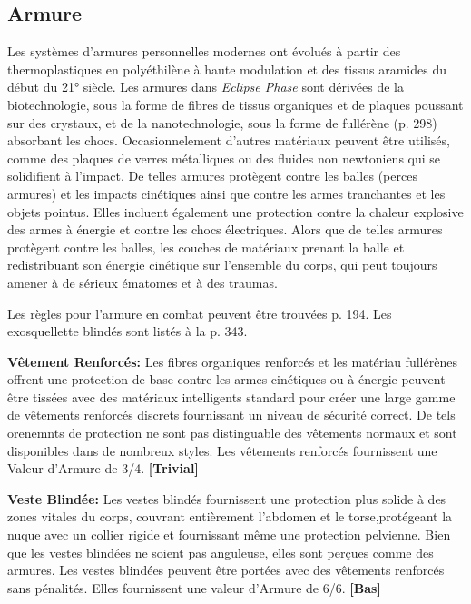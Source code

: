 {{\subsection{Armure} \label{sec:armor} 

Les systèmes d'armures personnelles modernes ont évolués à partir des thermoplastiques en polyéthilène à haute modulation et des tissus aramides du début du 21° siècle. Les armures dans \emph{Eclipse Phase} sont dérivées de la biotechnologie, sous la forme de fibres de tissus organiques et de plaques poussant sur des crystaux, et de la nanotechnologie, sous la forme de fullérène (p. 298) absorbant les chocs. Occasionnelement d'autres matériaux peuvent être utilisés, comme des plaques de verres métalliques ou des fluides non newtoniens qui se solidifient à l'impact. De telles armures protègent contre les balles (perces armures) et les impacts cinétiques ainsi que contre les armes tranchantes et les objets pointus. Elles incluent également une protection contre la chaleur explosive des armes à énergie et contre les chocs électriques. Alors que de telles armures protègent contre les balles, les couches de matériaux prenant la balle et redistribuant son énergie cinétique sur l'ensemble du corps, qui peut toujours amener à de sérieux ématomes et à des traumas. 

Les règles pour l'armure en combat peuvent être trouvées p. 194. Les exosquellette blindés sont listés à la p. 343. 

\textbf{Vêtement Renforcés:} Les fibres organiques renforcés et les matériau fullérènes offrent une protection de base contre les armes cinétiques ou à énergie peuvent être tissées avec des matériaux intelligents standard pour créer une large gamme de vêtements renforcés discrets fournissant un niveau de sécurité correct. De tels orenemnts de protection ne sont pas distinguable des vêtements normaux et sont disponibles dans de nombreux styles. Les vêtements renforcés fournissent une Valeur d'Armure de 3/4. \textbf{[Trivial]} 

\textbf{Veste Blindée:} Les vestes blindés fournissent une protection plus solide à des zones vitales du corps, couvrant entièrement l'abdomen et le torse,protégeant la nuque avec un collier rigide et fournissant même une protection pelvienne. Bien que les vestes blindées ne soient pas anguleuse, elles sont perçues comme des armures. Les vestes blindées peuvent être portées avec des vêtements renforcés sans pénalités. Elles fournissent une valeur d'Armure de 6/6. \textbf{[Bas]} 

}}
